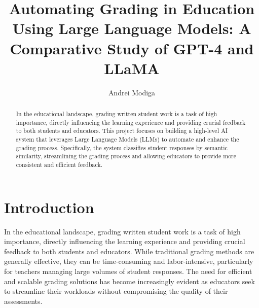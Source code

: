 \documentclass[ms,twoside,print]{nuthesis}
\begin{document}
\frontmatter

\title{Automating Grading in Education Using Large Language Models: A Comparative Study of GPT-4 and LLaMA}
\author{Andrei Modiga}



\maketitle

\begin{abstract}
    In the educational landscape, grading written student work is a task of high importance, directly influencing the learning 
    experience and providing crucial feedback to both students and educators. This project focuses on building a high-level AI system 
    that leverages Large Language Models (LLMs) to automate and enhance the grading process. Specifically, the system classifies student responses 
    by semantic similarity, streamlining the grading process and allowing educators to provide more consistent and efficient feedback.
\end{abstract}
    




\setcounter{tocdepth}{2} %
\tableofcontents
\listoffigures
\listoftables

\mainmatter

\chapter{Introduction}
In the educational landscape, grading written student work is a task of high importance, directly influencing the 
learning experience and providing crucial feedback to both students and educators. While traditional grading methods 
are generally effective, they can be time-consuming and labor-intensive, particularly for teachers managing large
volumes of student responses. The need for efficient and scalable grading solutions has become increasingly 
evident as educators seek to streamline their workloads without compromising the quality of their assessments.
\end{document}
